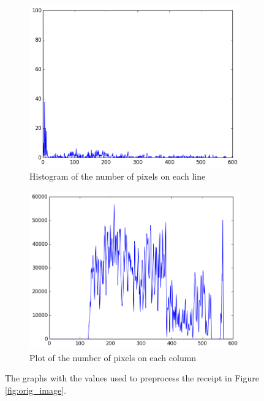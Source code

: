 \begin{figure}
\centering
\begin{subfigure}{\linewidth}
  \centering
  \includegraphics[width=\linewidth]{img/hist.png}
  \caption{Histogram of the number of pixels on each line}
  \label{fig:hist_plot}
\end{subfigure}
\begin{subfigure}{\linewidth}
  \centering
  \includegraphics[width=\linewidth]{img/edges.png}
  \caption{Plot of the number of pixels on each column}
  \label{fig:edge_plot}
\end{subfigure}
\caption{\label{fig:plots}
The graphs with the values used to preprocess the receipt in Figure \ref{fig:orig_image}. }
\end{figure}

